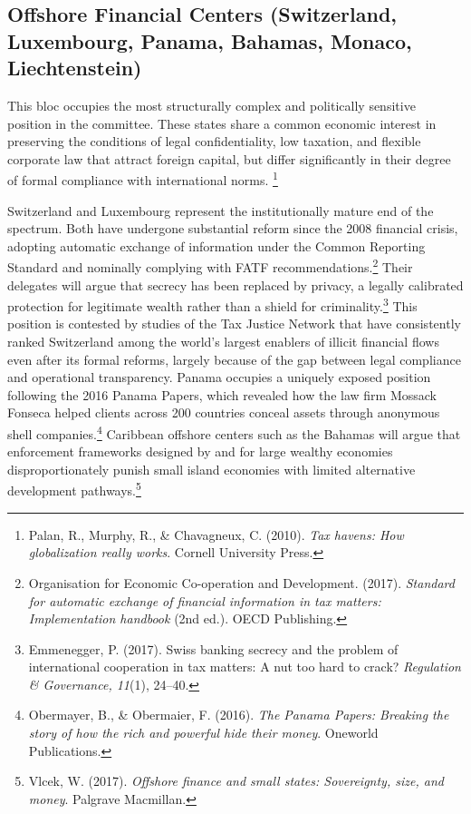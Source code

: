 \subsection{Offshore Financial Centers (Switzerland, Luxembourg, Panama, Bahamas, Monaco, Liechtenstein)}

This bloc occupies the most structurally complex and politically sensitive position in the committee. These states share a common economic interest in preserving the conditions of legal confidentiality, low taxation, and flexible corporate law that attract foreign capital, but differ significantly in their degree of formal compliance with international norms. \footnote{Palan, R., Murphy, R., \& Chavagneux, C. (2010). \emph{Tax havens: How globalization really works}. Cornell University Press.}

Switzerland and Luxembourg represent the institutionally mature end of the spectrum. Both have undergone substantial reform since the 2008 financial crisis, adopting automatic exchange of information under the Common Reporting Standard and nominally complying with FATF recommendations.\footnote{Organisation for Economic Co-operation and Development. (2017). \emph{Standard for automatic exchange of financial information in tax matters: Implementation handbook} (2nd ed.). OECD Publishing.} Their delegates will argue that secrecy has been replaced by privacy, a legally calibrated protection for legitimate wealth rather than a shield for criminality.\footnote{Emmenegger, P. (2017). Swiss banking secrecy and the problem of international cooperation in tax matters: A nut too hard to crack? \emph{Regulation \& Governance, 11}(1), 24–40.} This position is contested by studies of the Tax Justice Network that have consistently ranked Switzerland among the world's largest enablers of illicit financial flows even after its formal reforms, largely because of the gap between legal compliance and operational transparency. Panama occupies a uniquely exposed position following the 2016 Panama Papers, which revealed how the law firm Mossack Fonseca helped clients across 200 countries conceal assets through anonymous shell companies.\footnote{Obermayer, B., \& Obermaier, F. (2016). \emph{The Panama Papers: Breaking the story of how the rich and powerful hide their money}. Oneworld Publications.} Caribbean offshore centers such as the Bahamas will argue that enforcement frameworks designed by and for large wealthy economies disproportionately punish small island economies with limited alternative development pathways.\footnote{Vlcek, W. (2017). \emph{Offshore finance and small states: Sovereignty, size, and money}. Palgrave Macmillan.}

